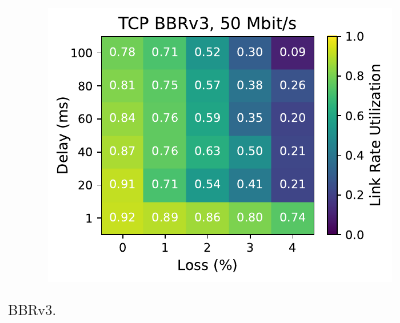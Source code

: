 \begin{figure}[ht]
\begin{subfigure}[b]{1cm}
        \includegraphics[width=\linewidth,trim={8cm 0 0 0},clip]{figures/heatmaps/heatmap_tcp_bbr3_50mbps.pdf}
        \vspace*{0.01cm}
    \end{subfigure}
    \caption{BBRv3.}
\end{figure}

